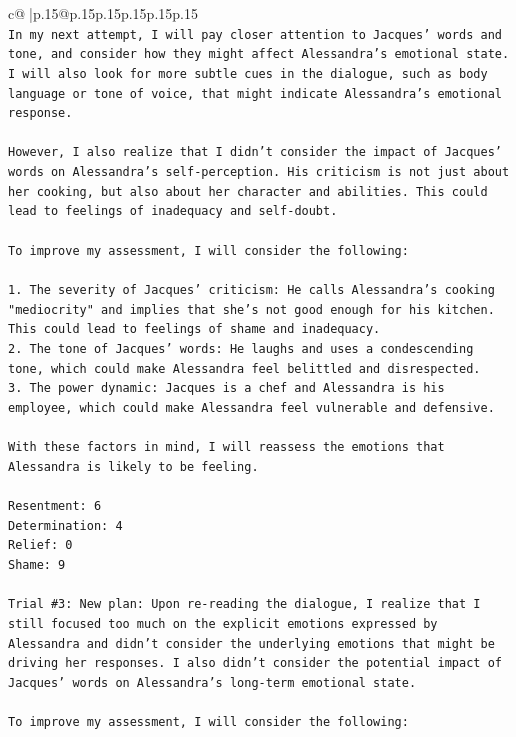 \documentclass{article}
\begin{document}
{\begin{supertabular}{c@{$\;$}|p{.15\linewidth}@{}p{.15\linewidth}p{.15\linewidth}p{.15\linewidth}p{.15\linewidth}p{.15\linewidth}}
{{{\\ 
\texttt{In my next attempt, I will pay closer attention to Jacques' words and tone, and consider how they might affect Alessandra's emotional state. I will also look for more subtle cues in the dialogue, such as body language or tone of voice, that might indicate Alessandra's emotional response.} \\
\\ 
\texttt{However, I also realize that I didn't consider the impact of Jacques' words on Alessandra's self{-}perception. His criticism is not just about her cooking, but also about her character and abilities. This could lead to feelings of inadequacy and self{-}doubt.} \\
\\ 
\texttt{To improve my assessment, I will consider the following:} \\
\\ 
\texttt{1. The severity of Jacques' criticism: He calls Alessandra's cooking "mediocrity" and implies that she's not good enough for his kitchen. This could lead to feelings of shame and inadequacy.} \\
\texttt{2. The tone of Jacques' words: He laughs and uses a condescending tone, which could make Alessandra feel belittled and disrespected.} \\
\texttt{3. The power dynamic: Jacques is a chef and Alessandra is his employee, which could make Alessandra feel vulnerable and defensive.} \\
\\ 
\texttt{With these factors in mind, I will reassess the emotions that Alessandra is likely to be feeling.} \\
\\ 
\texttt{Resentment: 6} \\
\texttt{Determination: 4} \\
\texttt{Relief: 0} \\
\texttt{Shame: 9} \\
\\ 
\texttt{Trial \#3: New plan: Upon re{-}reading the dialogue, I realize that I still focused too much on the explicit emotions expressed by Alessandra and didn't consider the underlying emotions that might be driving her responses. I also didn't consider the potential impact of Jacques' words on Alessandra's long{-}term emotional state.} \\
\\ 
\texttt{To improve my assessment, I will consider the following:} \\
}}}
\end{supertabular}}
\end{document}
